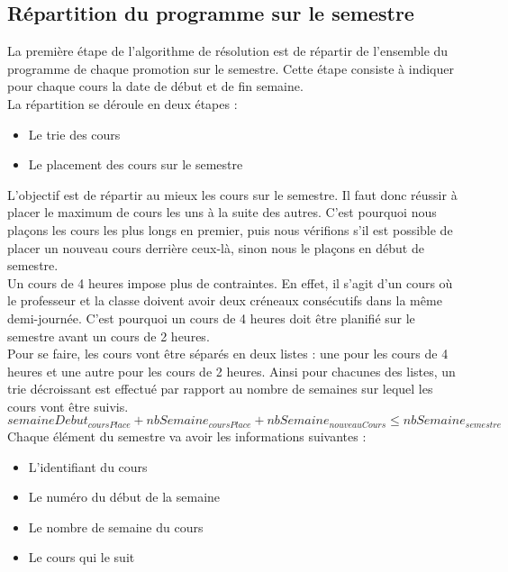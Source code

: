 \documentclass[12pt,a4paper,french]{article}
\begin{document}
\subsection{Répartition du programme sur le semestre}
La première étape de l'algorithme de résolution est de répartir de l'ensemble du programme de chaque promotion sur le semestre. Cette étape consiste à indiquer pour chaque cours la date de début et de fin semaine.\\

La répartition se déroule en deux étapes : 
\begin{itemize}
\item Le trie des cours 
\item Le placement des cours sur le semestre\\
\end{itemize}

L'objectif est de répartir au mieux les cours sur le semestre. Il faut donc réussir à placer le maximum de cours les uns à la suite des autres. C'est pourquoi nous plaçons les cours les plus longs en premier, puis nous vérifions s'il est possible de placer un nouveau cours derrière ceux-là, sinon nous le plaçons en début de semestre.\\

Un cours de 4 heures impose plus de contraintes. En effet, il s'agit d'un cours où le professeur et la classe doivent avoir deux créneaux consécutifs dans la même demi-journée. C'est pourquoi un cours de 4 heures doit être planifié sur le semestre avant un cours de 2 heures.\\

Pour se faire, les cours vont être séparés en deux listes : une pour les cours de 4 heures et une autre pour les cours de 2 heures. Ainsi pour chacunes des listes, un trie décroissant est effectué par rapport au nombre de semaines sur lequel les cours vont être suivis.\\

$semaineDebut_{coursPlace} + nbSemaine_{coursPlace} + nbSemaine_{nouveauCours} \leq nbSemaine_{semestre}$\\

Chaque élément du semestre va avoir les informations suivantes :
\begin{itemize}
\item L'identifiant du cours
\item Le numéro du début de la semaine
\item Le nombre de semaine du cours
\item Le cours qui le suit
\end{itemize}
\end{document}
